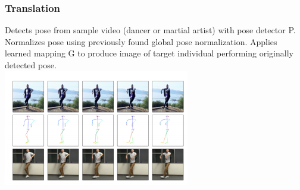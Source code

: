 \documentclass{beamer}
\begin{document}
     \begin{frame}
        \frametitle{Translation}
        Detects pose from sample video (dancer or martial artist) with pose detector P. \\
        \vspace{0.2in}
        Normalizes pose using previously found global pose normalization. Applies learned mapping G to produce image of target individual performing originally detected pose.\\
        \vspace{0.2in}
        \includegraphics[scale=.8]{images/translate.png}
    \end{frame}
\end{document}

